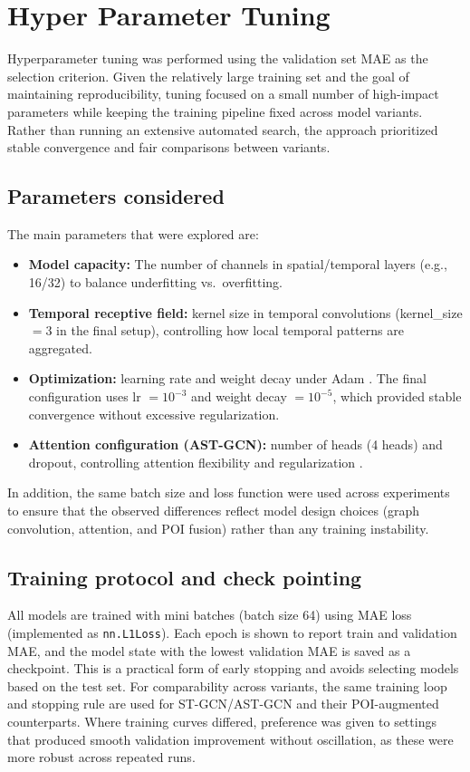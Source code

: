 \documentclass[11pt]{report}
\begin{document}
\section{Hyper Parameter Tuning}
Hyperparameter tuning was performed using the validation set MAE as the selection criterion. Given the relatively large training set and the goal of maintaining reproducibility, tuning focused on a small number of high-impact parameters while keeping the training pipeline fixed across model variants. Rather than running an extensive automated search, the approach prioritized stable convergence and fair comparisons between variants.

\subsection{Parameters considered}
The main parameters that were explored are:
\begin{itemize}
    \item \textbf{Model capacity:} The number of channels in spatial/temporal layers (e.g., 16/32) to balance underfitting vs.\ overfitting.
    \item \textbf{Temporal receptive field:} kernel size in temporal convolutions (kernel\_size $=3$ in the final setup), controlling how local temporal patterns are aggregated.
    \item \textbf{Optimization:} learning rate and weight decay under Adam \cite{kingma2015adam}. The final configuration uses lr $=10^{-3}$ and weight decay $=10^{-5}$, which provided stable convergence without excessive regularization.
    \item \textbf{Attention configuration (AST-GCN):} number of heads (4 heads) and dropout, controlling attention flexibility and regularization \cite{vaswani2017attention}.
\end{itemize}
In addition, the same batch size and loss function were used across experiments to ensure that the observed differences reflect model design choices (graph convolution, attention, and POI fusion) rather than any training instability.

\subsection{Training protocol and check pointing}
All models are trained with mini batches (batch size 64) using MAE loss (implemented as \texttt{nn.L1Loss}). Each epoch is shown to report train and validation MAE, and the model state with the lowest validation MAE is saved as a checkpoint. This is a practical form of early stopping and avoids selecting models based on the test set. For comparability across variants, the same training loop and stopping rule are used for ST-GCN/AST-GCN and their POI-augmented counterparts. Where training curves differed, preference was given to settings that produced smooth validation improvement without oscillation, as these were more robust across repeated runs.
\end{document}
